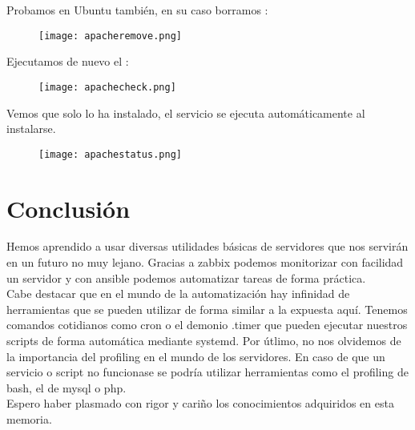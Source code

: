 Probamos en Ubuntu también, en su caso borramos :
\begin{figure}[H]
	\centering
	\texttt{[image: apacheremove.png]} 
\end{figure}

Ejecutamos de nuevo el :
\begin{figure}[H]
	\centering
	\texttt{[image: apachecheck.png]} 
\end{figure}
Vemos que solo lo ha instalado, el servicio se ejecuta automáticamente al instalarse.
\begin{figure}[H]
	\centering
	\texttt{[image: apachestatus.png]} 
\end{figure}

\section{Conclusión}
Hemos aprendido a usar diversas utilidades básicas de servidores que nos servirán en un futuro no muy lejano. Gracias a zabbix podemos monitorizar con facilidad un servidor y con ansible podemos automatizar tareas de forma práctica. \\
 
 Cabe destacar que en el mundo de la automatización hay infinidad de herramientas que se pueden utilizar de forma similar a la expuesta aquí. Tenemos comandos cotidianos como cron o el demonio .timer que pueden ejecutar nuestros scripts de forma automática mediante systemd. Por útlimo, no nos olvidemos de la importancia del profiling en el mundo de los servidores. En caso de que un servicio o script no funcionase se podría utilizar herramientas como el profiling de bash, el de mysql o php. \\
 
 Espero haber plasmado con rigor y cariño los conocimientos adquiridos en esta memoria. 
\newpage



